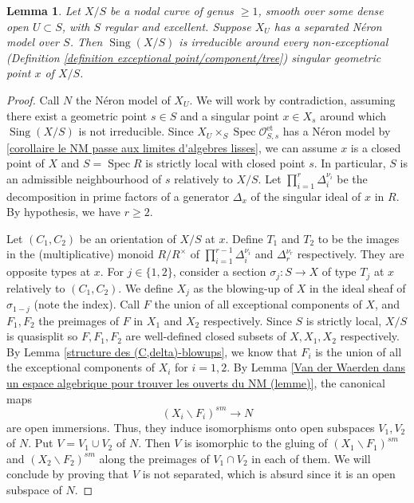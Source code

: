 \documentclass[a4paper,12pt]{amsart} %
\numberwithin{equation}{subsection}
\newcommand{\on}[1]{\operatorname{#1}}
\def\Sing{\operatorname{Sing}}
\newcommand{\Spec}{\operatorname{Spec}}
\theoremstyle{definition}
\theoremstyle{plain}%
\newtheorem{lemma}[definition]{Lemma}
\theoremstyle{remark}
\renewcommand{\O}{\mathcal{O}}
\begin{document}
\begin{lemma}\label{lemme necessite de l'irreducililite du lieu singulier}
Let $X/S$ be a nodal curve of genus $\geq 1$, smooth over some dense open $U\subset S$, with $S$ regular and excellent. Suppose $X_U$ has a separated N\'eron model over $S$. Then $\Sing(X/S)$ is irreducible around every non-exceptional (Definition \ref{definition exceptional point/component/tree}) singular geometric point $x$ of $X/S$.
\end{lemma}


\begin{proof}
Call $N$ the Néron model of $X_U$. We will work by contradiction, assuming there exist a geometric point $s\in S$ and a singular point $x\in X_s$ around which $\Sing(X/S)$ is not irreducible. Since $X_U\times_S\Spec\O_{S,s}^{\on{et}}$ has a N\'eron model by \ref{corollaire le NM passe aux limites d'algebres lisses}, we can assume $x$ is a closed point of $X$ and $S=\Spec R$ is strictly local with closed point $s$. In particular, $S$ is an admissible neighbourhood of $s$ relatively to $X/S$. Let $\prod\limits_{i=1}^r\Delta_i^{\nu_i}$ be the decomposition in prime factors of a generator $\Delta_x$ of the singular ideal of $x$ in $R$. By hypothesis, we have $r\geq 2$.

Let $(C_1,C_2)$ be an orientation of $X/S$ at $x$. Define $T_1$ and $T_2$ to be the images in the (multiplicative) monoid $R/R^\times$ of $\prod\limits_{i=1}^{r-1}\Delta_i^{\nu_i}$ and $\Delta_r^{\nu_r}$ respectively. They are opposite types at $x$. For $j\in\{1,2\}$, consider a section $\sigma_j\colon S\to X$ of type $T_j$ at $x$ relatively to $(C_1,C_2)$. We define $X_j$ as the blowing-up of $X$ in the ideal sheaf of $\sigma_{1-j}$ (note the index). Call $F$ the union of all exceptional components of $X$, and $F_1,F_2$ the preimages of $F$ in $X_1$ and $X_2$ respectively. Since $S$ is strictly local, $X/S$ is quasisplit so $F,F_1,F_2$ are well-defined closed subsets of $X,X_1,X_2$ respectively. By Lemma \ref{structure des (C,delta)-blowups}, we know that $F_i$ is the union of all the exceptional components of $X_i$ for $i=1,2$. By Lemma \ref{Van der Waerden dans un espace algebrique pour trouver les ouverts du NM (lemme)}, the canonical maps
\[
(X_i\backslash F_i)^{sm}\to N
\]
are open immersions. Thus, they induce isomorphisms onto open subspaces $V_1,V_2$ of $N$. Put $V=V_1\cup V_2$ of $N$. Then $V$ is isomorphic to the gluing of $(X_1\backslash F_1)^{sm}$ and $(X_2\backslash F_2)^{sm}$ along the preimages of $V_1\cap V_2$ in each of them. We will conclude by proving that $V$ is not separated, which is absurd since it is an open subspace of $N$.


\end{proof}
\end{document}
